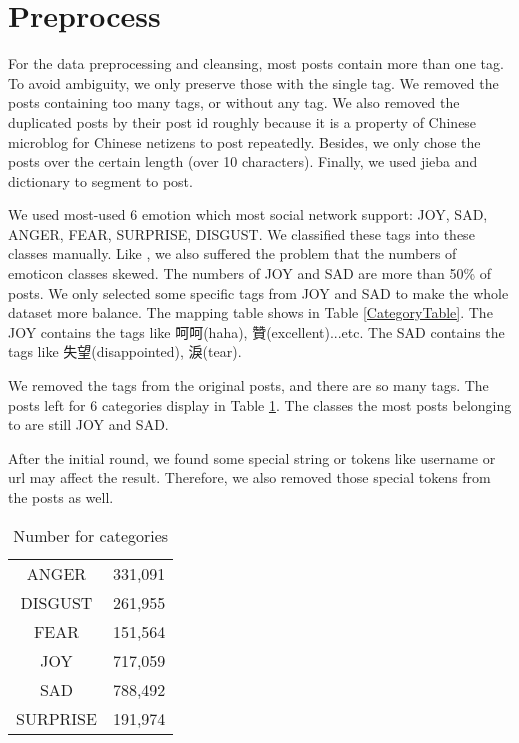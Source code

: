 \section{Preprocess}

For the data preprocessing and cleansing, most posts contain more than one tag. To avoid ambiguity, we only preserve those with the single tag.
We removed the posts containing too many tags, or without any tag. We also removed the duplicated posts by their post id roughly because it is a property of Chinese microblog \cite{fu2013reality} for Chinese netizens to post repeatedly. 
Besides, we only chose the posts over the certain length (over 10 characters). Finally, we used jieba and dictionary to segment to post. 

We used most-used 6 emotion which most social network support: JOY, SAD, ANGER, FEAR, SURPRISE, DISGUST.
We classified these tags into these classes manually. 
Like \cite{zhao2012moodlens}, we also suffered the problem that the numbers of emoticon classes skewed. The numbers of JOY and SAD are more than 50\% of posts. 
We only selected some specific tags from JOY and SAD to make the whole dataset more balance.   
The mapping table shows in Table \ref{CategoryTable}. The JOY contains the tags like 呵呵(haha), 贊(excellent)...etc. 
The SAD contains the tags like 失望(disappointed), 淚(tear).


We removed the tags from the original posts, and there are so many tags. 
The posts left for 6 categories display in Table \ref{cat_num}. 
The classes the most posts belonging to are still JOY and SAD. 

After the initial round, we found some special string or tokens like username or url may affect the result. 
Therefore, we also removed those special tokens from the posts as well.

\begin{table}[]
\centering
\caption{Number for categories}
\label{cat_num}
\begin{tabular}{|c|c|}
\hline
ANGER      &331,091 \\                                                           
DISGUST    &261,955 \\                                                         
FEAR       &151,564 \\                                                         
JOY        &717,059 \\                                                           
SAD        &788,492 \\                                                           
SURPRISE   &191,974 \\
\hline
\end{tabular}
\end{table}


